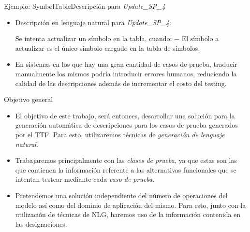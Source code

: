 \documentclass{beamer}
\begin{document}
\begin{frame}{Ejemplo: SymbolTable}{Descripción para \emph{Update\_SP\_4}}
  \begin{itemize}
    \item{
      Descripción en lenguaje natural para \emph{Update\_SP\_4}:\\
      \begin{exampleblock}{Se intenta actualizar un símbolo en la tabla, cuando:}
        $-$ El símbolo a actualizar es el único símbolo cargado en la tabla de símbolos.
      \end{exampleblock}
    }

    \item En sistemas en los que hay una gran cantidad de casos de prueba, traducir manualmente los mismos podría introducir errores humanos, reduciendo la calidad de las descripciones además de incrementar el costo del testing.
  \end{itemize}
\end{frame}
                                
\begin{frame}{Objetivo general}{}
  \begin{itemize}
    \item El objetivo de este trabajo, será entonces, desarrollar una solución para la generación automática de descripciones para los casos de prueba generados por el TTF. Para esto, utilizaremos técnicas de \emph{generación de lenguaje natural}.
    \item Trabajaremos principalmente con las \emph{clases de prueba}, ya que estas son las que contienen la información referente a las alternativas funcionales que se intentan testear mediante cada \emph{caso de prueba}.
    \item Pretendemos una solución independiente del número de operaciones del modelo así como del dominio de aplicación del mismo. Para esto, junto con la utilización de técnicas de NLG, haremos uso de la información contenida en las designaciones.
  \end{itemize}
\end{frame}
\end{document}
